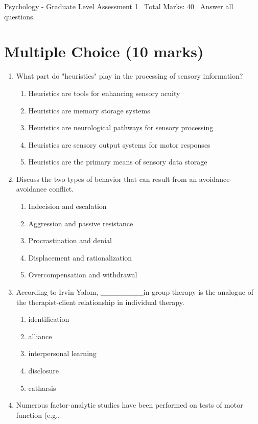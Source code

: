 \documentclass[12pt]{article}
\begin{document}
\begin{center}
Psychology - Graduate Level Assessment 1 \
Total Marks: 40 \
Answer all questions.
\end{center}

\section*{Multiple Choice (10 marks)}
\begin{enumerate}[label=\arabic*.]
\item What part do "heuristics" play in the processing of sensory information?
\begin{enumerate}[label=(\alph*)]
    \item Heuristics are tools for enhancing sensory acuity
    \item Heuristics are memory storage systems
    \item Heuristics are neurological pathways for sensory processing
    \item Heuristics are sensory output systems for motor responses
    \item Heuristics are the primary means of sensory data storage
\end{enumerate}
\item Discuss the two types of behavior that can result from an avoidance-avoidance conflict.
\begin{enumerate}[label=(\alph*)]
    \item Indecision and escalation
    \item Aggression and passive resistance
    \item Procrastination and denial
    \item Displacement and rationalization
    \item Overcompensation and withdrawal
\end{enumerate}
\item According to Irvin Yalom, \_\_\_\_\_\_\_\_in group therapy is the analogue of the therapist-client
relationship in individual therapy.
\begin{enumerate}[label=(\alph*)]
    \item identification
    \item alliance
    \item interpersonal learning
    \item disclosure
    \item catharsis
\end{enumerate}
\item Numerous factor-analytic studies have been performed on tests of motor function (e.g.,

\end{enumerate}
\end{document}
